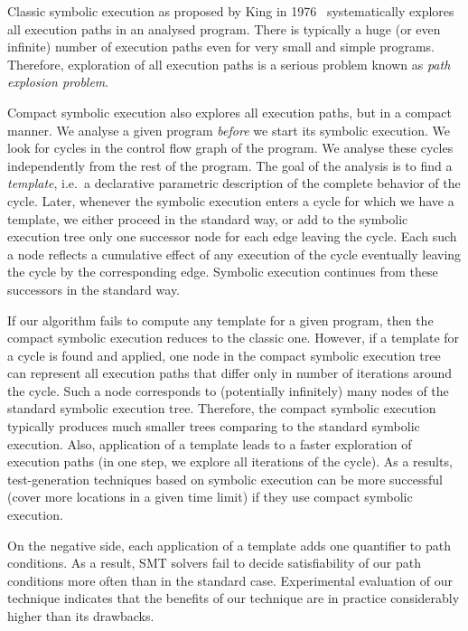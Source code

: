 \documentclass{sig-alternate}%
\begin{document}
Classic symbolic execution as proposed by King in 1976~\cite{Kin76}
systematically explores all execution paths in an analysed program.
There is typically a huge (or even infinite) number of execution paths even
for very small and simple programs. Therefore, exploration of all execution
paths is a serious problem known as \emph{path explosion problem}.

Compact symbolic execution also explores all execution paths, but in a
compact manner. We analyse a given program \emph{before} we start its
symbolic execution. We look for cycles in the control flow graph of the
program. %
We analyse these cycles independently from the rest of the program. The goal
of the analysis is to find a \emph{template}, i.e.~a declarative parametric
description of the complete behavior of the cycle. Later, whenever the
symbolic execution enters a cycle for which we have a template, we either
proceed in the standard way, or add to the symbolic execution tree only one
successor node for each edge leaving the cycle. Each such a node reflects a
cumulative effect of any execution of the cycle eventually leaving the cycle
by the corresponding edge. Symbolic execution continues from these
successors in the standard way. 

If our algorithm fails to compute any template for a given program, then the
compact symbolic execution reduces to the classic one. However, if a
template for a cycle is found and applied, one node in the compact symbolic
execution tree can represent all execution paths that differ only in number
of iterations around the cycle. Such a node corresponds to (potentially
infinitely) many nodes of the standard symbolic execution tree. Therefore,
the compact symbolic execution typically produces much smaller trees
comparing to the standard symbolic execution. Also, application of a
template leads to a faster exploration of execution paths (in one step, we
explore all iterations of the cycle). As a results, test-generation
techniques based on symbolic execution can be more successful (cover more
locations in a given time limit) if they use compact symbolic execution.

On the negative side, each application of a template adds one quantifier to
path conditions. As a result, SMT solvers fail to decide satisfiability of
our path conditions more often than in the standard case. Experimental
evaluation of our technique indicates that the benefits of our technique are
in practice considerably higher than its drawbacks.
\end{document}
